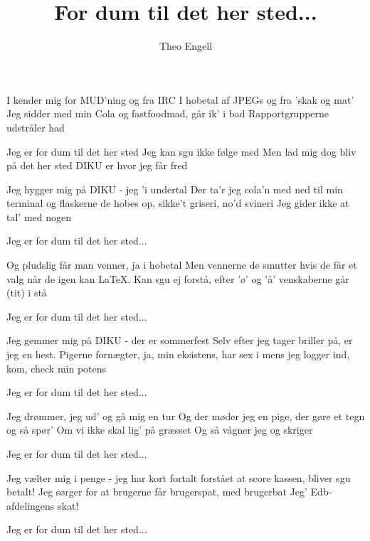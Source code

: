 \documentclass[danish]{article}
\title{For dum til det her sted...}
\author{Theo Engell}
\begin{document}
\maketitle

\begin{song}
 I kender mig for MUD'ning og fra IRC
I hobetal af JPEGs og fra 'skak og mat'
Jeg sidder med min Cola og fastfoodmad, går ik' i bad
Rapportgrupperne udstråler had

  Jeg er for dum til det her sted
  Jeg kan sgu ikke følge med
  Men lad mig dog bliv på det her sted
  DIKU er hvor jeg får fred

 Jeg hygger mig på DIKU - jeg 'i undertal
Der ta'r jeg cola'n med ned til min terminal
og flaskerne de hobes op, sikke't griseri, no'd svineri
Jeg gider ikke at tal' med nogen

  Jeg er for dum til det her sted...

 Og pludslig får man venner, ja i hobetal
Men vennerne de smutter hvis de får et valg
når de igen kan LaTeX. Kan sgu ej forstå, efter 'ø' og 'å'
venskaberne går (tit) i stå

  Jeg er for dum til det her sted...

 Jeg gemmer mig på DIKU - der er sommerfest
Selv efter jeg tager briller på, er jeg en hest.
Pigerne fornægter, ja, min eksistens, har sex i mens
jeg logger ind, kom, check min potens

  Jeg er for dum til det her sted...

 Jeg drømmer, jeg ud' og gå mig en tur
 Og der møder jeg en pige, der gøre
                 et tegn og så spør'
 Om vi ikke skal lig' på græsset
 Og så vågner jeg og skriger

  Jeg er for dum til det her sted...

\vspace{1cm}

 Jeg vælter mig i penge - jeg har kort fortalt
             forstået at score kassen, bliver sgu betalt!
             Jeg sørger for at brugerne får brugerspat, med brugerbat
             Jeg' Edb-afdelingens skat!

  Jeg er for dum til det her sted...

\end{song}
\end{document}

